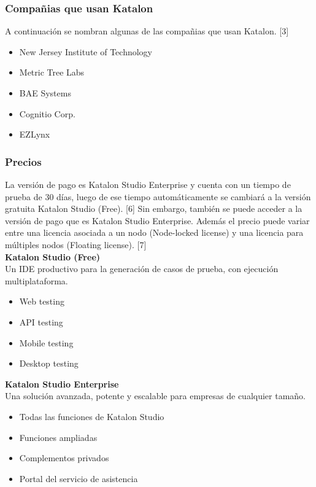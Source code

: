 \documentclass[twoside,twocolumn]{article}
\begin{document}
\subsubsection{Compañias que usan Katalon}

A continuación se nombran algunas de las compañias que usan Katalon. [3]

\begin{itemize}
  \item New Jersey Institute of Technology
  \item Metric Tree Labs
  \item BAE Systems
  \item Cognitio Corp.
  \item EZLynx
\end{itemize}

\subsubsection{Precios}

La versión de pago es Katalon Studio Enterprise y cuenta con un tiempo de prueba de 30 días, luego de ese tiempo automáticamente se cambiará a la versión gratuita Katalon Studio (Free). [6] Sin embargo, también se puede acceder a la versión de pago que es Katalon Studio Enterprise. Además el precio puede variar entre una licencia asociada a un nodo (Node-locked license) y una licencia para múltiples nodos (Floating license). [7] \\

\textbf{Katalon Studio (Free)} \\

Un IDE productivo para la generación de casos de prueba,
con ejecución multiplataforma.

\begin{itemize}
  \item Web testing
  \item API testing
  \item Mobile testing
  \item Desktop testing
\end{itemize}

\textbf{Katalon Studio Enterprise} \\

Una solución avanzada, potente y escalable para empresas de cualquier tamaño.

\begin{itemize}
  \item Todas las funciones de Katalon Studio
  \item Funciones ampliadas
  \item Complementos privados
  \item Portal del servicio de asistencia
\end{itemize}
\end{document}
